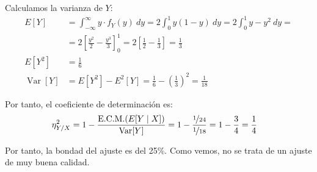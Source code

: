 \documentclass[12pt]{article}
\DeclareMathOperator{\Var}{Var}
\begin{document}
\begin{ejercicio}[5 puntos]
\begin{enumerate}
            Calculamos la varianza de $Y$:
            \begin{align*}
                E[Y] &= \int_{-\infty}^{\infty} y\cdot f_Y(y) \ dy
                = 2\int_{0}^{1} y(1-y) \ dy
                = 2\int_{0}^{1} y-y^2 \ dy
                =\\&= 2\left[\frac{y^2}{2}-\frac{y^3}{3}\right]_{0}^{1}
                = 2\left[\frac{1}{2}-\frac{1}{3}\right]
                = \frac{1}{3} \\
                E[Y^2] &= \frac{1}{6} \\
                \Var[Y] &= E[Y^2] - E^2[Y] = \frac{1}{6} - \left(\frac{1}{3}\right)^2 = \frac{1}{18}
            \end{align*}

            Por tanto, el coeficiente de determinación es:
            \begin{align*}
                \eta^2_{Y / X} &= 1-\frac{\text{E.C.M.}(E[Y\mid X])}{\Var[Y]}
                = 1-\frac{\nicefrac{1}{24}}{\nicefrac{1}{18}}
                = 1-\frac{3}{4}
                = \frac{1}{4}
            \end{align*}

            Por tanto, la bondad del ajuste es del 25\%. Como vemos, no se trata de un ajuste de muy buena calidad.
        \end{enumerate}
    \end{ejercicio}
\end{document}
